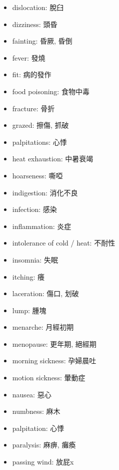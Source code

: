 \begin{multicols}{2}
\begin{itemize}
  \item dislocation: 脫臼
  \item dizziness: 頭昏
  \item fainting: 昏厥, 昏倒
  \item fever: 發燒
  \item fit: 病的發作
  \item food poisoning: 食物中毒
  \item fracture: 骨折
  \item grazed: 擦傷, 抓破
  \item palpitations: 心悸
  \item heat exhaustion: 中暑衰竭
  \item hoarseness: 嘶啞
  \item indigestion: 消化不良
  \item infection: 感染
  \item inflammation: 炎症
  \item intolerance of cold / heat: 不耐性
  \item insomnia: 失眠
  \item itching: 癢
  \item laceration: 傷口, 划破
  \item lump: 腫塊
  \item menarche: 月經初期
  \item menopause: 更年期, 絕經期
  \item morning sickness: 孕婦晨吐
  \item motion sickness: 暈動症
  \item nausea: 惡心
  \item numbness: 麻木
  \item palpitation: 心悸
  \item paralysis: 麻痹, 癱瘓
  \item passing wind: 放屁x
\end{itemize}
\end{multicols}

